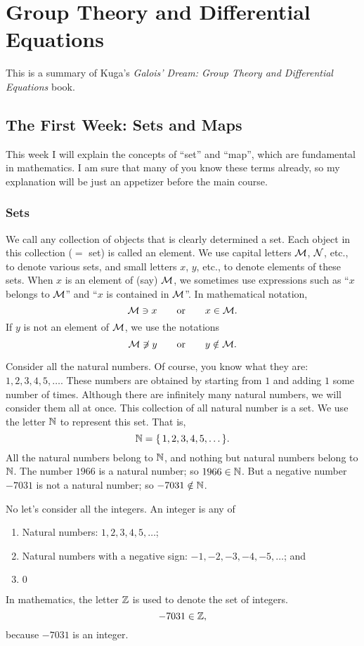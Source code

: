 \chapter{Group Theory and Differential Equations}
This is a summary of Kuga's \emph{Galois' Dream: Group Theory and
  Differential Equations} book.

\section{The First Week: Sets and Maps}
This week I will explain the concepts of ``set'' and ``map'', which are
fundamental in mathematics. I am sure that many of you know these terms
already, so my explanation will be just an appetizer before the main
course.

\subsection{Sets}
We call any collection of objects that is clearly determined a set. Each
object in this collection (\(=\) set) is called an element. We use capital
letters \(\mathcal{M}\), \(\mathcal{N}\), etc., to denote various sets, and small
letters \(x\), \(y\), etc., to denote elements of these sets. When \(x\) is
an element of (say) \(\mathcal{M}\), we sometimes use expressions such as ``\(x\)
belongs to \(\mathcal{M}\)'' and ``\(x\) is contained in \(\mathcal{M}\)''. In
mathematical notation,
\[
  \mathcal{M}\ni x\qquad\text{or}\qquad x\in\mathcal{M}.
\]
If \(y\) is not an element of \(\mathcal{M}\), we use the notations
\[
  \mathcal{M}\not\ni y\qquad\text{or}\qquad y\notin\mathcal{M}.
\]

\begin{example}
  Consider all the natural numbers. Of course, you know what they are:
  \(1,2,3,4,5,\dotsc\). These numbers are obtained by starting from \(1\)
  and adding \(1\) some number of times. Although there are infinitely many
  natural numbers, we will consider them all at once. This collection of
  all natural number is a set. We use the letter \(\mathbb{N}\) to represent this
  set. That is,
  \[
    \mathbb{N}=\{\,1,2,3,4,5,\dotsc\,\}.
  \]
  All the natural numbers belong to \(\mathbb{N}\), and nothing but natural
  numbers belong to \(\mathbb{N}\). The number \(1966\) is a natural number; so
  \(1966\in\mathbb{N}\). But a negative number \(-7031\) is not a natural number;
  so \(-7031\notin\mathbb{N}\).
\end{example}

\begin{example}
  No let's consider all the integers. An integer is any of
  \begin{enumerate}[label=\arabic*),noitemsep]
  \item Natural numbers: \(1,2,3,4,5,\dotsc\);
  \item Natural numbers with a negative sign: \(-1,-2,-3,-4,-5,\dotsc\);
    and
  \item \(0\)
  \end{enumerate}
\end{example}

In mathematics, the letter \(\mathbb{Z}\) is used to denote the set of integers.
\[
  -7031\in\mathbb{Z},
\]
because \(-7031\) is an integer.

